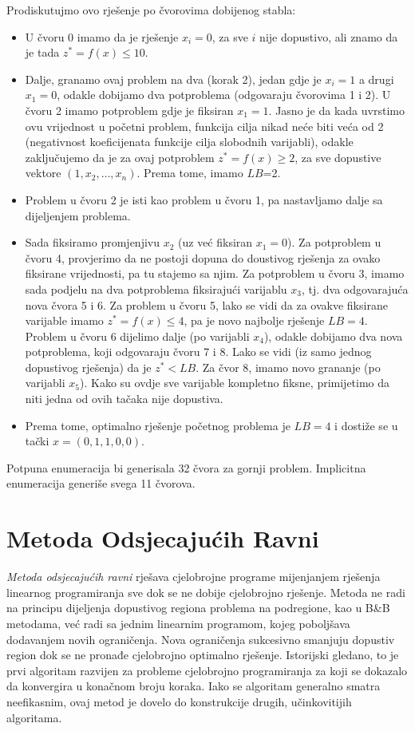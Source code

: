 \documentclass[a4paper, utf8, 11pt, colorlinks]{book}
\begin{document}
Prodiskutujmo ovo rješenje po čvorovima dobijenog stabla:
  \begin{itemize}
      \item U čvoru 0 imamo da je rješenje $x_i = 0$, za sve $i$ nije dopustivo, ali znamo da je tada $z^*=f(x) \leq 10$.
      \item  Dalje, granamo ovaj problem na dva (korak 2), jedan gdje je $x_i=1$ a drugi $x_1=0$, odakle dobijamo dva potproblema (odgovaraju čvorovima 1 i 2). U čvoru 2 imamo potproblem gdje je fiksiran $x_1=1$. Jasno je da kada uvrstimo ovu vrijednost u početni problem, funkcija cilja nikad neće biti veća od 2 (negativnost koeficijenata funkcije cilja slobodnih varijabli), odakle zaključujemo da je za ovaj potproblem $z^*=f(x) \geq 2$, za sve dopustive vektore $(1,x_2,\ldots,x_n)$. Prema tome, imamo $LB$=2. 
      \item Problem u čvoru 2 je isti kao problem u čvoru 1, pa nastavljamo dalje sa dijeljenjem problema. 
      \item Sada fiksiramo promjenjivu $x_2$ (uz već fiksiran $x_1=0$). 
            Za potproblem u čvoru 4, provjerimo da ne postoji dopuna do doustivog rješenja za ovako fiksirane vrijednosti, pa tu stajemo sa njim. Za potproblem u čvoru 3, imamo sada podjelu na dva potproblema fiksirajući varijablu $x_3$, tj. dva odgovarajuća nova čvora 5 i 6. Za problem u čvoru 5, lako se vidi da za ovakve fiksirane varijable imamo 
            $z^*=f(x) \leq 4$, pa je novo najbolje rješenje $LB=4$. Problem u čvoru 6 dijelimo dalje (po varijabli $x_4$), odakle dobijamo dva nova potproblema, koji odgovaraju čvoru 7 i 8. Lako se vidi (iz samo jednog dopustivog rješenja) da je $z^*<LB$.  Za čvor 8, imamo novo grananje (po varijabli $x_5$). Kako su ovdje sve varijable kompletno fiksne, primijetimo da niti jedna od ovih tačaka  nije dopustiva.
            \item Prema tome, optimalno rješenje početnog problema je $LB=4$ i dostiže se u tački $x=(0, 1, 1, 0, 0)$. 
  \end{itemize}
  Potpuna enumeracija bi generisala 32 čvora za gornji problem. Implicitna enumeracija generiše svega 11 čvorova. 
 
\section{Metoda Odsjecajućih Ravni}
  
\emph{Metoda odsjecajućih ravni} rješava cjelobrojne programe mijenjanjem rješenja linearnog programiranja sve dok se ne dobije cjelobrojno rješenje. Metoda ne radi  na principu dijeljenja dopustivog regiona problema na podregione, kao u B\&B metodama, već radi sa jednim linearnim programom, kojeg poboljšava dodavanjem novih ograničenja. Nova ograničenja sukcesivno smanjuju dopustiv region dok se ne pronađe cjelobrojno optimalno rješenje.   
 Istorijski gledano, to je prvi algoritam razvijen za probleme cjelobrojno programiranja za koji se dokazalo da konvergira u konačnom broju
koraka. Iako se algoritam generalno smatra   neefikasnim, ovaj metod je dovelo do konstrukcije drugih, učinkovitijih algoritama.  
  
\end{document}
